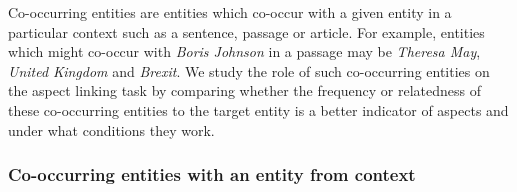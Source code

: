 Co-occurring entities are entities which co-occur with a given entity in a particular context such as a sentence, passage or article. For example, entities which might co-occur with \textit{Boris Johnson} in a passage may be \textit{Theresa May}, \textit{United Kingdom} and \textit{Brexit}. We study the role of such co-occurring entities on the aspect linking task by comparing whether the frequency or relatedness of these co-occurring entities to the target entity is a better indicator of aspects and under what conditions they work. 


\subsubsection{Co-occurring entities with an entity from context}
\label{subsubsec:Co-occurring entities with an entity from context}


    
    
    
